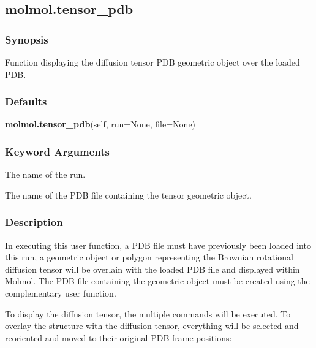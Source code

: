   

 \newpage 

 \subsection{molmol.tensor\_pdb} 

  
 \subsubsection{Synopsis} 

 Function displaying the diffusion tensor PDB geometric object over the loaded PDB. 
  

  
 \subsubsection{Defaults} 

 \textsf{\textbf{molmol.tensor\_pdb}(self, run=None, file=None)} 

  
 \subsubsection{Keyword Arguments} 

   The name of the run.   

   The name of the PDB file containing the tensor geometric object.  

  

  
 \subsubsection{Description} 

 In executing this user function, a PDB file must have previously been loaded into this run, a geometric object or polygon representing the Brownian rotational diffusion tensor will be overlain with the loaded PDB file and displayed within Molmol.  The PDB file containing the geometric object must be created using the complementary  user function. 
  

 To display the diffusion tensor, the multiple commands will be executed.  To overlay the structure with the diffusion tensor, everything will be selected and reoriented and moved to their original PDB frame positions: 
  

